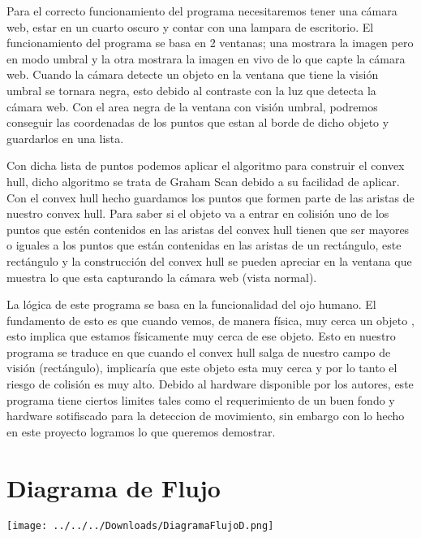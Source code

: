\documentclass[]{article}
\begin{document}
Para el correcto funcionamiento del programa necesitaremos tener una cámara web, estar en un cuarto oscuro y contar con una lampara de escritorio. El funcionamiento del programa se basa en 2 ventanas; una mostrara la imagen pero en modo umbral y la otra mostrara la imagen en vivo de lo que capte la cámara web. Cuando la cámara detecte un objeto en la ventana que tiene la visión umbral se tornara negra, esto debido al contraste con la luz que detecta la cámara web. Con el area negra de la ventana con visión umbral, podremos conseguir las coordenadas de los puntos que estan al borde de dicho objeto y guardarlos en una lista.

Con dicha lista de puntos podemos aplicar el algoritmo para construir el convex hull, dicho algoritmo se trata de Graham Scan debido a su facilidad de aplicar. Con el convex hull hecho guardamos los puntos que formen parte de las aristas de nuestro convex hull. Para saber si el objeto va a entrar en colisión uno de los puntos que estén contenidos en las aristas del convex hull tienen que ser mayores o iguales a los puntos que están contenidas en las aristas de un rectángulo, este rectángulo y la construcción del convex hull se pueden apreciar en la ventana que muestra lo que esta capturando la cámara web (vista normal).

La lógica de este programa se basa en la funcionalidad del ojo humano. El fundamento de esto es que cuando vemos, de manera física, muy cerca un objeto , esto implica que estamos físicamente muy cerca de ese objeto. Esto en nuestro programa se traduce en que cuando el convex hull salga de nuestro campo de visión (rectángulo), implicaría que este objeto esta muy cerca y por lo tanto el riesgo de colisión es muy alto. Debido al hardware disponible por los autores, este programa tiene ciertos limites tales como el requerimiento de un buen fondo y hardware sotifiscado para la deteccion de movimiento, sin embargo con lo hecho en este proyecto logramos lo que queremos demostrar.

\section{Diagrama de Flujo}
\texttt{[image: ../../../Downloads/DiagramaFlujoD.png]}
\end{document}
